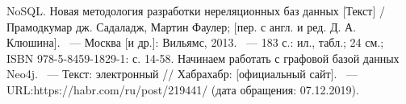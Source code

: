 \nocite{*}


\begin{thebibliography}{}
NoSQL. Новая методология разработки нереляционных баз данных [Текст] / Прамодкумар дж. Садаладж, Мартин Фаулер; [пер. с англ. и ред. Д. А. Клюшина]. ~--- Москва [и др.]: Вильямс, 2013. ~--- 183 с.: ил., табл.; 24 см.; ISBN 978-5-8459-1829-1: с. 14-58.
Начинаем работать с графовой базой данных Neo4j. ~--- Текст: электронный // Хабрахабр: [официальный сайт]. ~--- URL:https://habr.com/ru/post/219441/ (дата обращения: 07.12.2019).

\end{thebibliography}